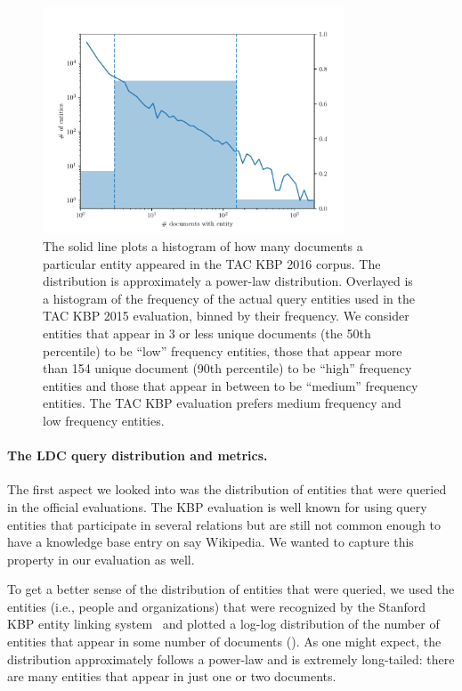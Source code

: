 \begin{figure}
  \centering
  \includegraphics[width=0.8\textwidth]{figures/analysis/distribution}
  \caption[TAC KBP 2015 Query entity distribution]{\label{fig:kbpo:distribution}
    The solid line plots a histogram of how many documents a particular entity appeared in the TAC KBP 2016 corpus.
    The distribution is approximately a power-law distribution.
    Overlayed is a histogram of the frequency of the actual query entities used in the TAC KBP 2015 evaluation, binned by their frequency. We consider entities that appear in 3 or less unique documents (the 50th percentile) to be ``low'' frequency entities, those that appear more than 154 unique document (90th percentile) to be ``high'' frequency entities and those that appear in between to be ``medium'' frequency entities.
    The TAC KBP evaluation prefers medium frequency and low frequency entities.
  }
\end{figure}

\paragraph{The LDC query distribution and metrics.}
The first aspect we looked into was the distribution of entities that were queried in the official evaluations. 
The KBP evaluation is well known for using query entities that participate in several relations but are still not common enough to have a knowledge base entry on say Wikipedia.
We wanted to capture this property in our evaluation as well.

To get a better sense of the distribution of entities that were queried, we used the entities (i.e., people and organizations) that were recognized by the Stanford KBP entity linking system~\citep{stanford2017kbp} and plotted a log-log distribution of the number of entities that appear in some number of documents ().
As one might expect, the distribution approximately follows a power-law and is extremely long-tailed: there are many entities that appear in just one or two documents. 

